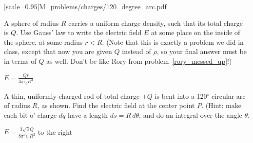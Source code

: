 [scale=0.95]{M_problems/charges/120_degree_arc.pdf}{
\begin{Exercise}
A sphere of radius $R$ carries a uniform charge density, such that its total charge is $Q$. 
Use Gauss' law to write the electric field $E$ at some place on the inside of the sphere, at some radius $r<R$.  
 (Note that this is exactly a problem we did in class, except that now you are given $Q$ instead of $\rho$, so your final answer must be in terms of $Q$ as well.  Don't be like Rory from problem~\ref{rory_messed_up}!)
\end{Exercise}
\begin{Answer}
$\displaystyle E=\frac{Qr}{4\pi \epsilon_0 R^3}$
\end{Answer}



\begin{Exercise}
A thin, uniformly charged rod of total charge $+Q$ is bent into a 120$^\circ$ circular arc of radius $R$, as shown.  
Find the electric field at the center point $P$.   (Hint: make each bit o' charge $dq$ have a length $ds=R\,d\theta$, and do an integral over the angle $\theta$. 
\end{Exercise}
\begin{Answer}
$\displaystyle E = \frac{3 \sqrt{3} Q} {8 \pi^2 \epsilon_0 R^2}$ to the right
\end{Answer}
}

